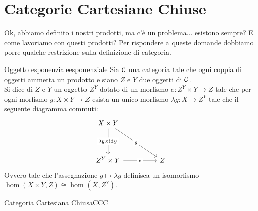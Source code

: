 \documentclass{article}
\renewcommand\C{\mc{C}}
\begin{document}
\section{Categorie Cartesiane Chiuse}

Ok, abbiamo definito i nostri prodotti, ma c'è un problema... esistono sempre? E come lavoriamo con questi prodotti? Per rispondere a queste domande dobbiamo porre qualche restrizione sulla definizione di categoria.

\begin{definition}{Oggetto esponenziale}{esponenziale}
    Sia $\C$ una categoria tale che ogni coppia di oggetti ammetta un prodotto e siano $Z$ e $Y$ due oggetti di $\C$.\\
    Si dice  di $Z$ e $Y$ un oggetto $Z^Y$ dotato di un morfismo $e: Z^Y\times Y \to Z$ tale che per ogni morfismo $g : X\times Y \to Z$ esista un unico morfismo $\lambda g : X\to Z^Y$ tale che il seguente diagramma commuti:
    \[\begin{tikzcd}
    	{X\times Y} \\
    	\\
    	{Z^Y\times Y} && Z
    	\arrow["{\lambda g\times \id_Y}"{description}, from=1-1, to=3-1]
    	\arrow["g"{description}, from=1-1, to=3-3]
    	\arrow["e"{description}, from=3-1, to=3-3]
    \end{tikzcd}\]
    Ovvero tale che l'assegnazione $g \mapsto \lambda g$ definisca un isomorfismo $\hom(X\times Y, Z)\cong \hom(X, Z^Y)$.
\end{definition}

\begin{definition}{Categoria Cartesiana Chiusa}{CCC}
    
\end{definition}
\end{document}
